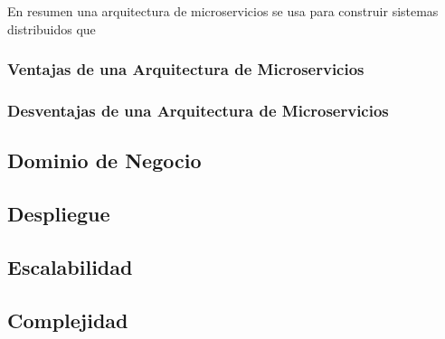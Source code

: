 En resumen una arquitectura de microservicios se usa para construir sistemas distribuidos que

\subsubsection{Ventajas de una Arquitectura de Microservicios}
\subsubsection{Desventajas de una Arquitectura de Microservicios}

\subsection{Dominio de Negocio}
\subsection{Despliegue}

\subsection{Escalabilidad}

\subsection{Complejidad}

